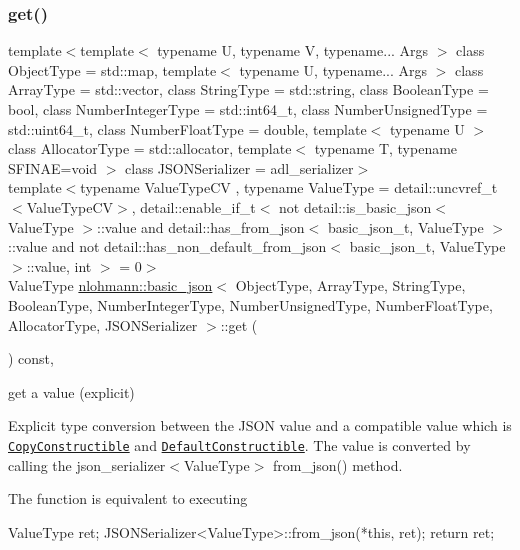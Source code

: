\subsubsection{\texorpdfstring{get()}{get()}\hspace{0.1cm}{\footnotesize\ttfamily [3/6]}}
{\footnotesize\ttfamily template$<$template$<$ typename U, typename V, typename... Args $>$ class Object\+Type = std\+::map, template$<$ typename U, typename... Args $>$ class Array\+Type = std\+::vector, class String\+Type  = std\+::string, class Boolean\+Type  = bool, class Number\+Integer\+Type  = std\+::int64\+\_\+t, class Number\+Unsigned\+Type  = std\+::uint64\+\_\+t, class Number\+Float\+Type  = double, template$<$ typename U $>$ class Allocator\+Type = std\+::allocator, template$<$ typename T, typename S\+F\+I\+N\+A\+E=void $>$ class J\+S\+O\+N\+Serializer = adl\+\_\+serializer$>$ \\
template$<$typename Value\+Type\+CV , typename Value\+Type  = detail\+::uncvref\+\_\+t$<$\+Value\+Type\+C\+V$>$, detail\+::enable\+\_\+if\+\_\+t$<$ not detail\+::is\+\_\+basic\+\_\+json$<$ Value\+Type $>$\+::value and detail\+::has\+\_\+from\+\_\+json$<$ basic\+\_\+json\+\_\+t, Value\+Type $>$\+::value and not detail\+::has\+\_\+non\+\_\+default\+\_\+from\+\_\+json$<$ basic\+\_\+json\+\_\+t, Value\+Type $>$\+::value, int $>$  = 0$>$ \\
Value\+Type \mbox{\hyperlink{classnlohmann_1_1basic__json}{nlohmann\+::basic\+\_\+json}}$<$ Object\+Type, Array\+Type, String\+Type, Boolean\+Type, Number\+Integer\+Type, Number\+Unsigned\+Type, Number\+Float\+Type, Allocator\+Type, J\+S\+O\+N\+Serializer $>$\+::get (\begin{DoxyParamCaption}{ }\end{DoxyParamCaption}) const\hspace{0.3cm}{\ttfamily [inline]}, {\ttfamily [noexcept]}}



get a value (explicit) 

Explicit type conversion between the J\+S\+ON value and a compatible value which is \href{https://en.cppreference.com/w/cpp/named_req/CopyConstructible}{\tt Copy\+Constructible} and \href{https://en.cppreference.com/w/cpp/named_req/DefaultConstructible}{\tt Default\+Constructible}. The value is converted by calling the json\+\_\+serializer$<$\+Value\+Type$>$ {\ttfamily from\+\_\+json()} method.

The function is equivalent to executing 
\begin{DoxyCode}
ValueType ret;
JSONSerializer<ValueType>::from\_json(*\textcolor{keyword}{this}, ret);
\textcolor{keywordflow}{return} ret;
\end{DoxyCode}


